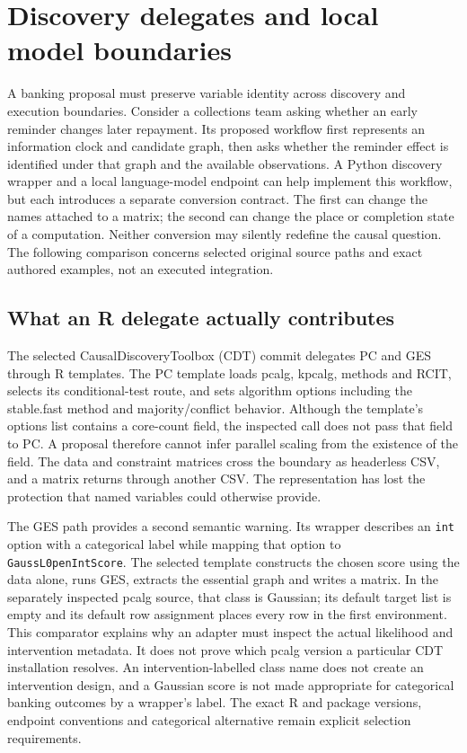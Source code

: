 \section[Discovery delegates and local model boundaries]{Discovery delegates and local model boundaries}
\label{sec:exec28-bp}
A banking proposal must preserve variable identity across discovery and execution boundaries.
Consider a collections team asking whether an early reminder changes later repayment.
Its proposed workflow first represents an information clock and candidate graph, then asks whether
the reminder effect is identified under that graph and the available observations. A Python
discovery wrapper and a local language-model endpoint can help implement this workflow, but each
introduces a separate conversion contract. The first can change the names attached to a matrix;
the second can change the place or completion state of a computation. Neither conversion may
silently redefine the causal question. The following comparison concerns selected original
source paths and exact authored examples, not an executed integration.

\subsection{What an R delegate actually contributes}
The selected CausalDiscoveryToolbox (CDT) commit delegates PC and GES through R templates.
The PC template loads pcalg, kpcalg, methods and RCIT, selects its conditional-test route, and
sets algorithm options including the stable.fast method and majority/conflict behavior.
Although the template's options list contains a core-count field, the inspected call does not
pass that field to PC. A proposal therefore cannot infer parallel scaling from the existence
of the field. The data and constraint matrices cross the boundary as headerless CSV, and a
matrix returns through another CSV. The representation has lost the protection that named
variables could otherwise provide.\citep{exec28_bp_cdt}

The GES path provides a second semantic warning. Its wrapper describes an \texttt{int} option
with a categorical label while mapping that option to \texttt{GaussL0penIntScore}. The selected
template constructs the chosen score using the data alone, runs GES, extracts the essential
graph and writes a matrix. In the separately inspected pcalg source, that class is Gaussian;
its default target list is empty and its default row assignment places every row in the first
environment. This comparator explains why an adapter must inspect the actual likelihood and
intervention metadata. It does not prove which pcalg version a particular CDT installation
resolves. An intervention-labelled class name does not create an intervention design, and a
Gaussian score is not made appropriate for categorical banking outcomes by a wrapper's label.
The exact R and package versions, endpoint conventions and categorical alternative remain
explicit selection requirements.\citep{exec28_bp_cdt}

